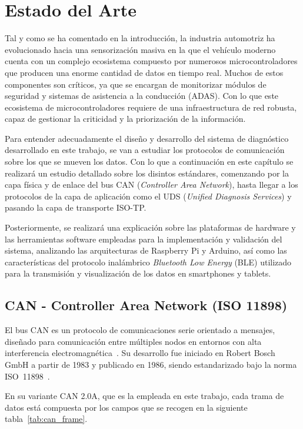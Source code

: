 \section{Estado del Arte}
\label{sec:protocolos}

Tal y como se ha comentado en la introducción, la industria automotriz ha evolucionado hacia una sensorización masiva en la que el vehículo moderno cuenta con un complejo ecosistema compuesto por numerosos microcontroladores que producen una enorme cantidad de datos en tiempo real. Muchos de estos componentes son críticos, ya que se encargan de monitorizar módulos de seguridad y sistemas de asistencia a la conducción (ADAS). Con lo que este ecosistema de microcontroladores requiere de una infraestructura de red  robusta, capaz de gestionar la criticidad y la priorización de la información.

Para entender adecuadamente el diseño y desarrollo del sistema de diagnóstico desarrollado en este trabajo, se van a estudiar los protocolos de comunicación sobre los que se mueven los datos. Con lo que a continuación en este capítulo se realizará un estudio detallado sobre los disintos estándares, comenzando por la capa física y de enlace del bus CAN (\textit{Controller Area Network}), hasta llegar a los protocolos de la capa de aplicación como el UDS (\textit{Unified Diagnosis Services}) y pasando la capa de transporte ISO-TP.

Posteriormente, se realizará una explicación sobre las plataformas de hardware y las herramientas software empleadas para la implementación y validación del sistema, analizando las arquitecturas de Raspberry Pi y Arduino, así como las características del protocolo inalámbrico \textit{Bluetooth Low Energy} (BLE) utilizado para la transmisión y visualización de los datos en smartphones y tablets.

\subsection{CAN - Controller Area Network (ISO 11898)}
\label{sec:proto_can}

El bus CAN es un protocolo de comunicaciones serie orientado a mensajes, diseñado para comunicación entre múltiples nodos en entornos con alta interferencia electromagnética~\cite{ISO11898-1:2024}. Su desarrollo fue iniciado en Robert Bosch GmbH a partir de 1983 y publicado en 1986, siendo estandarizado bajo la norma ISO~11898~\cite{ISO11898:1993, CiA_CANhistory}.

En su variante CAN 2.0A, que es la empleada en este trabajo, cada trama de datos está compuesta por los campos que se recogen en la siguiente tabla~\ref{tab:can_frame}.

